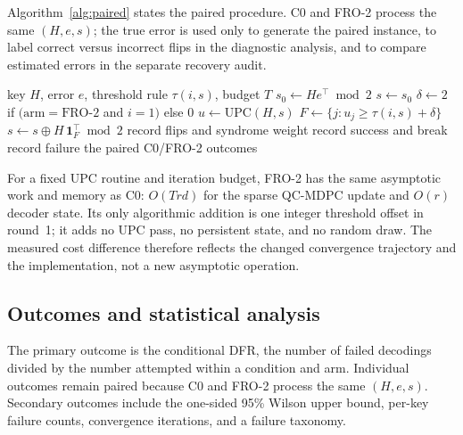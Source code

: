 \documentclass[lettersize,journal]{IEEEtran}
\begin{document}
Algorithm~\ref{alg:paired} states the paired procedure. C0 and FRO-2 process the same $(H,e,s)$; the true error is used only to generate the paired instance, to label correct versus incorrect flips in the diagnostic analysis, and to compare estimated errors in the separate recovery audit.

\begin{algorithm}[t]
\caption{Paired C0/FRO-2 decoding and evaluation}
\label{alg:paired}
\footnotesize
\begin{algorithmic}[1]
\Require key $H$, error $e$, threshold rule $\tau(i,s)$, budget $T$
\State $s_0 \gets H e^{\top} \bmod 2$ 
  \State $s\gets s_0$
    \State $\delta \gets 2$ if $(\mathrm{arm}=\mathrm{FRO\text{-}2}$ and $i=1)$ else $0$
    \State $u \gets \mathrm{UPC}(H,s)$
    \State $F \gets \{j: u_j \ge \tau(i,s)+\delta\}$
    \State $s \gets s \oplus H\,\mathbf{1}_F^{\top} \bmod 2$
    \State record flips and syndrome weight
     record success and break \EndIf
  \EndFor
   record failure \EndIf
\EndFor
\State \Return the paired C0/FRO-2 outcomes
\end{algorithmic}
\end{algorithm}

For a fixed UPC routine and iteration budget, FRO-2 has the same asymptotic work and memory as C0: $O(Trd)$ for the sparse QC-MDPC update and $O(r)$ decoder state. Its only algorithmic addition is one integer threshold offset in round~1; it adds no UPC pass, no persistent state, and no random draw. The measured cost difference therefore reflects the changed convergence trajectory and the implementation, not a new asymptotic operation.

\subsection{Outcomes and statistical analysis}

The primary outcome is the conditional DFR, the number of failed decodings divided by the number attempted within a condition and arm. Individual outcomes remain paired because C0 and FRO-2 process the same $(H,e,s)$. Secondary outcomes include the one-sided 95\% Wilson upper bound, per-key failure counts, convergence iterations, and a failure taxonomy.
\end{document}
